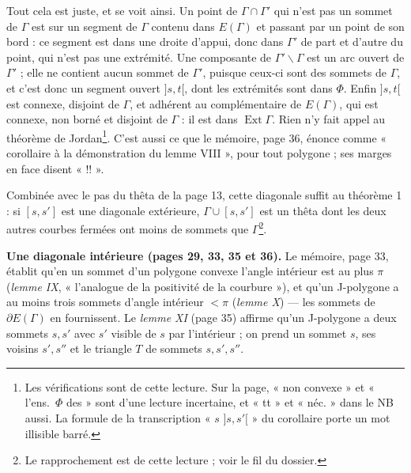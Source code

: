 \documentclass[11pt,a4paper]{article}
\begin{document}
Tout cela est juste, et se voit ainsi. Un point de $\Gamma \cap \Gamma'$ qui
n'est pas un sommet de $\Gamma$ est sur un segment de $\Gamma$ contenu dans
$E(\Gamma)$ et passant par un point de son bord : ce segment est dans une droite
d'appui, donc dans $\Gamma'$ de part et d'autre du point, qui n'est pas une
extrémité. Une composante de $\Gamma' \smallsetminus \Gamma$ est un arc ouvert
de $\Gamma'$ ; elle ne contient aucun sommet de $\Gamma'$, puisque ceux-ci sont
des sommets de $\Gamma$, et c'est donc un segment ouvert $]s, t[$, dont les
extrémités sont dans $\Phi$. Enfin $]s, t[$ est connexe, disjoint de $\Gamma$, et
adhérent au complémentaire de $E(\Gamma)$, qui est connexe, non borné et
disjoint de $\Gamma$ : il est dans $\operatorname{Ext}\Gamma$. Rien n'y fait
appel au théorème de Jordan\footnote{Les vérifications sont de cette lecture.
Sur la page, « non convexe » et « l'ens.\ $\Phi$ des » sont d'une lecture
incertaine, et « tt » et « néc. » dans le NB aussi. La formule de la
transcription « $s$ $]s, s'[$ » du corollaire porte un mot illisible barré.}.
C'est aussi ce que le mémoire, page 36, énonce comme « corollaire à la
démonstration du lemme VIII », pour tout polygone ; ses marges en face disent
« !! ».

Combinée avec le pas du thêta de la page 13, cette diagonale suffit au
théorème 1 : si $[s, s']$ est une diagonale extérieure, $\Gamma \cup [s, s']$
est un thêta dont les deux autres courbes fermées ont moins de sommets que
$\Gamma$\footnote{Le rapprochement est de cette lecture ; voir le fil du
dossier.}.

\textbf{Une diagonale intérieure (pages 29, 33, 35 et 36).} Le mémoire, page
33, établit qu'en un sommet d'un polygone convexe l'angle intérieur est au plus
$\pi$ (\emph{lemme IX}, « l'analogue de la positivité de la courbure »), et
qu'un J-polygone a au moins trois sommets d'angle intérieur $< \pi$
(\emph{lemme X}) — les sommets de $\partial E(\Gamma)$ en fournissent. Le
\emph{lemme XI} (page 35) affirme qu'un J-polygone a deux sommets $s, s'$ avec
$s'$ visible de $s$ par l'intérieur ; on prend un sommet $s$, ses voisins $s',
s''$ et le triangle $T$ de sommets $s, s', s''$.
\end{document}
